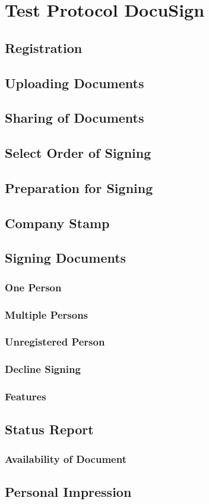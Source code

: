 \section{Test Protocol DocuSign}

\subsection{Registration}

\subsection{Uploading Documents}

\subsection{Sharing of Documents}

\subsection{Select Order of Signing}

\subsection{Preparation for Signing}

\subsection{Company Stamp}

\subsection{Signing Documents}

\subsubsection{One Person}

\subsubsection{Multiple Persons}

\subsubsection{Unregistered Person}

\subsubsection{Decline Signing}

\subsubsection{Features}

\subsection{Status Report}

\subsubsection{Availability of Document}

\subsection{Personal Impression}